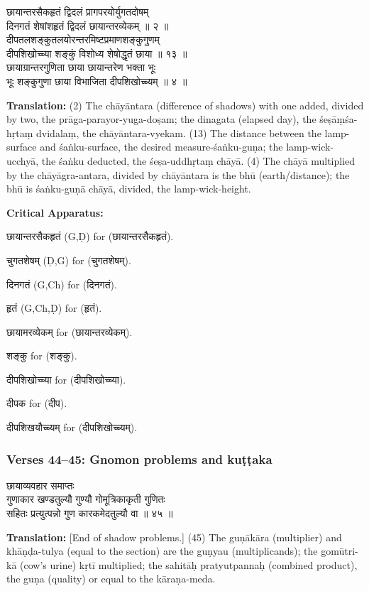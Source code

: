 \documentclass[11pt,a4paper]{article}
\newcommand{\dev}[1]{{\devanagarifont #1}}
\newcommand{\devbf}[1]{{\devanagarifontbf #1}}
\newcommand{\sanskritcol}[1]{%
  \begin{minipage}[t]{0.47\textwidth}
  \vspace{0pt}
  \begin{flushleft}
  #1
  \end{flushleft}
  \end{minipage}%
  \hfill
}
\newcommand{\englishcol}[1]{%
  \begin{minipage}[t]{0.47\textwidth}
  \vspace{0pt}
  \begin{flushleft}
  #1
  \end{flushleft}
  \end{minipage}%
}
\newenvironment{variants}{%
  \small%
  \color{varecolor}%
  \list{}{\leftmargin=2em\itemindent=-1em}%
}{\endlist}
\begin{document}
\noindent
\sanskritcol{\dev{छायान्तरसैकहृतं द्विदलं प्रागपरयोर्युगतदोषम्} \\ \dev{दिनगतं शेषांशहृतं द्विदलं छायान्तरव्येकम् ॥ २ ॥} \\[0.2cm]
\dev{दीपतलशङ्कुतलयोरन्तरमिष्टप्रमाणशङ्कुगुणम्} \\ \dev{दीपशिखोच्च्या शङ्कुं विशोध्य शेषोद्धृतं छाया ॥ १३ ॥} \\[0.2cm]
\dev{छायाग्रान्तरगुणिता छाया छायान्तरेण भक्ता भूः} \\ \dev{भूः शङ्कुगुणा छाया विभाजिता दीपशिखोच्च्यम् ॥ ४ ॥}}
\englishcol{\textbf{Translation:} (2) The chāyāntara (difference of shadows) with one added,
divided by two, the prāga-parayor-yuga-doṣam; the dinagata (elapsed day), the
śeṣāṃśa-hṛtaṃ dvidalaṃ, the chāyāntara-vyekam. (13) The distance between the lamp-surface
and śaṅku-surface, the desired measure-śaṅku-guṇa; the lamp-wick-ucchyā, the śaṅku
deducted, the śeṣa-uddhṛtaṃ chāyā. (4) The chāyā multiplied by the chāyāgra-antara,
divided by chāyāntara is the bhū (earth/distance); the bhū is śaṅku-guṇā chāyā,
divided, the lamp-wick-height.}

\vspace{0.4cm}
\textcolor{varecolor}{\textbf{Critical Apparatus:}}
\begin{variants}
\item[2.1] \dev{छायान्तरसैकहृतं} (G,Ḍ) \dev{for} (\dev{छायान्तरसैकहृतं}).
\item[2.2] \dev{चुगतशेषम्} (Ḍ,G) \dev{for} (\dev{चुगतशेषम्}).
\item[2.3] \dev{दिनगतं} (G,Ch) \dev{for} (\dev{दिनगतं}).
\item[2.4] \dev{हृतं} (G,Ch,Ḍ) \dev{for} (\dev{हृतं}).
\item[2.5] \dev{छायामरव्येकम्} \dev{for} (\dev{छायान्तरव्येकम्}).
\item[13.1] \dev{शङ्कु} \dev{for} (\dev{शङ्कु}).
\item[13.2] \dev{दीपशिखोच्च्या} \dev{for} (\dev{दीपशिखोच्च्या}).
\item[4.1] \dev{दीपक} \dev{for} (\dev{दीप}).
\item[4.2] \dev{दीपशिखयौच्च्यम्} \dev{for} (\dev{दीपशिखोच्च्यम्}).
\end{variants}

\subsubsection*{Verses 44--45: Gnomon problems and kuṭṭaka}

\noindent
\sanskritcol{\devbf{छायाव्यवहार समाप्तः} \\[0.2cm]
\dev{गुणाकार खण्डतुल्यौ गुण्यौ गोमूत्रिकाकृती गुणितः} \\ \dev{सहितः प्रत्युत्पन्नो गुण कारकमेदतुल्यौ वा ॥ ४५ ॥}}
\englishcol{\textbf{Translation:} [End of shadow problems.] (45) The guṇākāra (multiplier) and
khāṇḍa-tulya (equal to the section) are the guṇyau (multiplicands); the gomūtri-kā
(cow's urine) kṛtī multiplied; the sahitāḥ pratyutpannaḥ (combined product), the
guṇa (quality) or equal to the kāraṇa-meda.}
\end{document}
